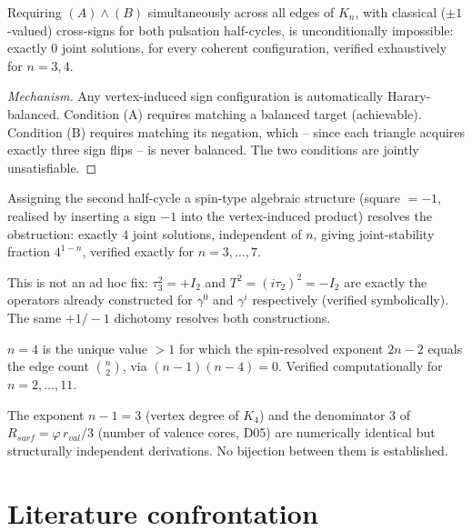 \documentclass[11pt]{article}
\begin{document}
\begin{theorembox}
Requiring $(A)\wedge(B)$ simultaneously across all edges of $K_n$, with classical ($\pm1$-valued) cross-signs for both pulsation half-cycles, is unconditionally impossible: exactly $0$ joint solutions, for every coherent configuration, verified exhaustively for $n=3,4$.
\end{theorembox}
\begin{proof}[Mechanism]
Any vertex-induced sign configuration is automatically Harary-balanced. Condition (A) requires matching a balanced target (achievable). Condition (B) requires matching its negation, which -- since each triangle acquires exactly three sign flips -- is never balanced. The two conditions are jointly unsatisfiable.
\end{proof}

\begin{theorembox}
Assigning the second half-cycle a spin-type algebraic structure (square $=-1$, realised by inserting a sign $-1$ into the vertex-induced product) resolves the obstruction: exactly $4$ joint solutions, independent of $n$, giving joint-stability fraction $4^{1-n}$, verified exactly for $n=3,\ldots,7$.
\end{theorembox}

\begin{corollarybox}
This is not an ad hoc fix: $\tau_3^2=+I_2$ and $T^2=(i\tau_2)^2=-I_2$ are exactly the operators already constructed \citep{D33} for $\gamma^0$ and $\gamma^i$ respectively (verified symbolically). The same $+1/-1$ dichotomy resolves both constructions.
\end{corollarybox}

\begin{theorembox}[Uniqueness of $n=4$]
$n=4$ is the unique value $>1$ for which the spin-resolved exponent $2n-2$ equals the edge count $\binom{n}{2}$, via $(n-1)(n-4)=0$. Verified computationally for $n=2,\ldots,11$.
\end{theorembox}

\begin{openproblembox}
The exponent $n-1=3$ (vertex degree of $K_4$) and the denominator $3$ of $R_{surf}=\varphi\,r_{val}/3$ (number of valence cores, D05) are numerically identical but structurally independent derivations. No bijection between them is established.
\end{openproblembox}

\section{Literature confrontation}
\label{sec:literature}
\end{document}
